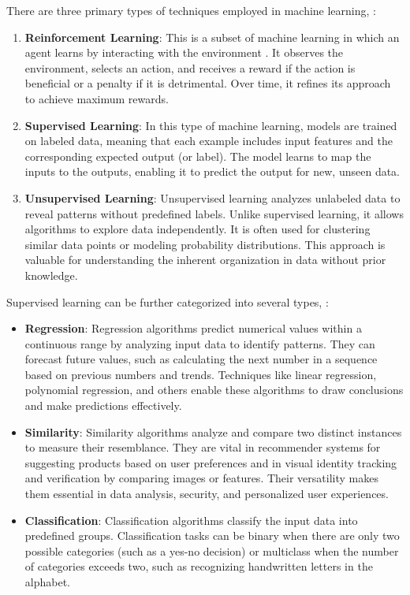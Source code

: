 There are three primary types of techniques employed in machine learning, \parencite{Mohri2012}:

\begin{enumerate}
    \item \textbf{Reinforcement Learning}: 
    This is a subset of machine learning in which an agent learns by interacting with the environment \parencite{Moradi2023}. It observes the environment, selects an action, and receives a reward if the action is beneficial or a penalty if it is detrimental. Over time, it refines its approach to achieve maximum rewards.

    \item \textbf{Supervised Learning}: 
    In this type of machine learning, models are trained on labeled data, meaning that each example includes input features and the corresponding expected output (or label). The model learns to map the inputs to the outputs, enabling it to predict the output for new, unseen data.

    \item \textbf{Unsupervised Learning}: 
    Unsupervised learning analyzes unlabeled data to reveal patterns without predefined labels. Unlike supervised learning, it allows algorithms to explore data independently. It is often used for clustering similar data points or modeling probability distributions. This approach is valuable for understanding the inherent organization in data without prior knowledge.
\end{enumerate}

Supervised learning can be further categorized into several types, \parencite{Mohri2012}:

\begin{itemize}
    \item \textbf{Regression}: 
    Regression algorithms predict numerical values within a continuous range by analyzing input data to identify patterns. They can forecast future values, such as calculating the next number in a sequence based on previous numbers and trends. Techniques like linear regression, polynomial regression, and others enable these algorithms to draw conclusions and make predictions effectively.
    
    \item \textbf{Similarity}: 
    Similarity algorithms analyze and compare two distinct instances to measure their resemblance. They are vital in recommender systems for suggesting products based on user preferences and in visual identity tracking and verification by comparing images or features. Their versatility makes them essential in data analysis, security, and personalized user experiences.
    
    \item \textbf{Classification}: 
    Classification algorithms classify the input data into predefined groups. Classification tasks can be binary when there are only two possible categories (such as a yes-no decision) or multiclass when the number of categories exceeds two, such as recognizing handwritten letters in the alphabet.
\end{itemize}

